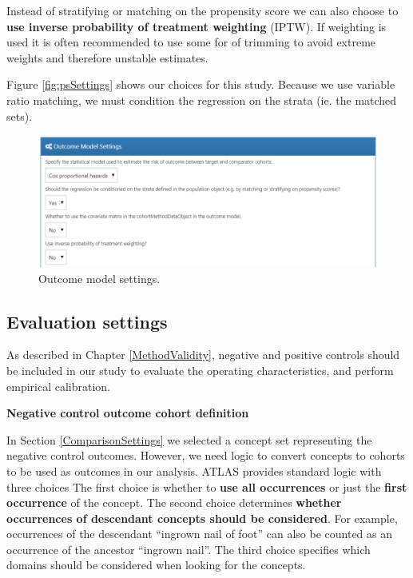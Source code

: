 \documentclass[11pt]{book}
\begin{document}
Instead of stratifying or matching on the propensity score we can also
choose to \textbf{use inverse probability of treatment weighting}
(IPTW). If weighting is used it is often recommended to use some for of
trimming to avoid extreme weights and therefore unstable estimates.

Figure \ref{fig:psSettings} shows our choices for this study. Because we
use variable ratio matching, we must condition the regression on the
strata (ie. the matched sets).

\begin{figure}

{\centering \includegraphics[width=1\linewidth]{images/PopulationLevelEstimation/outcomeModelSettings} 

}

\caption{Outcome model settings.}\label{fig:outcomeModelSettings}
\end{figure}

\subsection{Evaluation settings}\label{evaluationSettings}

As described in Chapter \ref{MethodValidity}, negative and positive
controls should be included in our study to evaluate the operating
characteristics, and perform empirical calibration.

\textbf{Negative control outcome cohort definition}

In Section \ref{ComparisonSettings} we selected a concept set
representing the negative control outcomes. However, we need logic to
convert concepts to cohorts to be used as outcomes in our analysis.
ATLAS provides standard logic with three choices The first choice is
whether to \textbf{use all occurrences} or just the \textbf{first
occurrence} of the concept. The second choice determines \textbf{whether
occurrences of descendant concepts should be considered}. For example,
occurrences of the descendant ``ingrown nail of foot'' can also be
counted as an occurrence of the ancestor ``ingrown nail''. The third
choice specifies which domains should be considered when looking for the
concepts.
\end{document}
